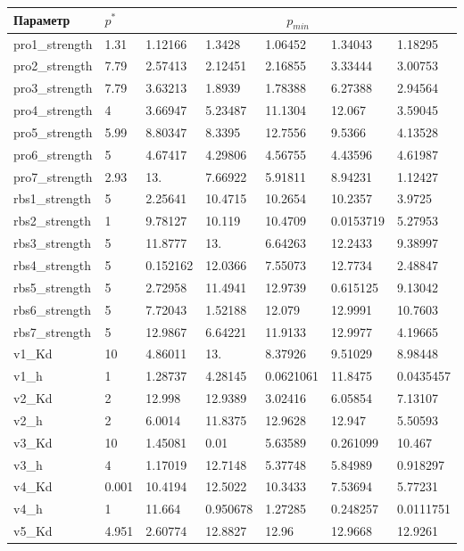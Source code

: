 \begin{tabular}{l|l|lllll}
Параметр & $p^*$ & \multicolumn{5}{c}{$p_{min}$} \\ 
\hline
pro1\_strength & 1.31 & 1.12166 & 1.3428 & 1.06452 & 1.34043 & 1.18295 \\ 
pro2\_strength & 7.79 & 2.57413 & 2.12451 & 2.16855 & 3.33444 & 3.00753 \\ 
pro3\_strength & 7.79 & 3.63213 & 1.8939 & 1.78388 & 6.27388 & 2.94564 \\ 
pro4\_strength & 4 & 3.66947 & 5.23487 & 11.1304 & 12.067 & 3.59045 \\ 
pro5\_strength & 5.99 & 8.80347 & 8.3395 & 12.7556 & 9.5366 & 4.13528 \\ 
pro6\_strength & 5 & 4.67417 & 4.29806 & 4.56755 & 4.43596 & 4.61987 \\ 
pro7\_strength & 2.93 & 13. & 7.66922 & 5.91811 & 8.94231 & 1.12427 \\ 
rbs1\_strength & 5 & 2.25641 & 10.4715 & 10.2654 & 10.2357 & 3.9725 \\ 
rbs2\_strength & 1 & 9.78127 & 10.119 & 10.4709 & 0.0153719 & 5.27953 \\ 
rbs3\_strength & 5 & 11.8777 & 13. & 6.64263 & 12.2433 & 9.38997 \\ 
rbs4\_strength & 5 & 0.152162 & 12.0366 & 7.55073 & 12.7734 & 2.48847 \\ 
rbs5\_strength & 5 & 2.72958 & 11.4941 & 12.9739 & 0.615125 & 9.13042 \\ 
rbs6\_strength & 5 & 7.72043 & 1.52188 & 12.079 & 12.9991 & 10.7603 \\ 
rbs7\_strength & 5 & 12.9867 & 6.64221 & 11.9133 & 12.9977 & 4.19665 \\ 
v1\_Kd & 10 & 4.86011 & 13. & 8.37926 & 9.51029 & 8.98448 \\ 
v1\_h & 1 & 1.28737 & 4.28145 & 0.0621061 & 11.8475 & 0.0435457 \\ 
v2\_Kd & 2 & 12.998 & 12.9389 & 3.02416 & 6.05854 & 7.13107 \\ 
v2\_h & 2 & 6.0014 & 11.8375 & 12.9628 & 12.947 & 5.50593 \\ 
v3\_Kd & 10 & 1.45081 & 0.01 & 5.63589 & 0.261099 & 10.467 \\ 
v3\_h & 4 & 1.17019 & 12.7148 & 5.37748 & 5.84989 & 0.918297 \\ 
v4\_Kd & 0.001 & 10.4194 & 12.5022 & 10.3433 & 7.53694 & 5.77231 \\ 
v4\_h & 1 & 11.664 & 0.950678 & 1.27285 & 0.248257 & 0.0111751 \\ 
v5\_Kd & 4.951 & 2.60774 & 12.8827 & 12.96 & 12.9668 & 12.9261 \\ 

\end{tabular}

